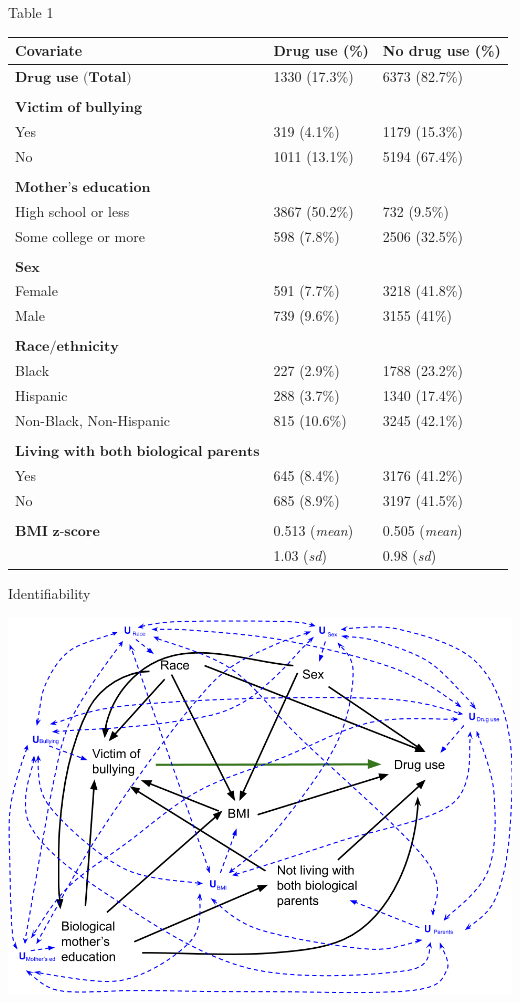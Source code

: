 \documentclass[ignorenonframetext,]{beamer}
\begin{document}
\begin{frame}{Table 1}

\fontsize{8}{8} \selectfont 

\begin{longtable}[]{@{}lll@{}}
\toprule
Covariate & Drug use (\%) & No drug use (\%)\tabularnewline
\midrule
\endhead
\(\textbf{Drug use (Total)}\) & 1330 (17.3\%) & 6373
(82.7\%)\tabularnewline
& &\tabularnewline
\(\textbf{Victim of bullying}\) & &\tabularnewline
Yes & 319 (4.1\%) & 1179 (15.3\%)\tabularnewline
No & 1011 (13.1\%) & 5194 (67.4\%)\tabularnewline
& &\tabularnewline
\(\textbf{Mother's education}\) & &\tabularnewline
High school or less & 3867 (50.2\%) & 732 (9.5\%)\tabularnewline
Some college or more & 598 (7.8\%) & 2506 (32.5\%)\tabularnewline
& &\tabularnewline
\(\textbf{Sex}\) & &\tabularnewline
Female & 591 (7.7\%) & 3218 (41.8\%)\tabularnewline
Male & 739 (9.6\%) & 3155 (41\%)\tabularnewline
& &\tabularnewline
\(\textbf{Race/ethnicity}\) & &\tabularnewline
Black & 227 (2.9\%) & 1788 (23.2\%)\tabularnewline
Hispanic & 288 (3.7\%) & 1340 (17.4\%)\tabularnewline
Non-Black, Non-Hispanic & 815 (10.6\%) & 3245 (42.1\%)\tabularnewline
& &\tabularnewline
\(\textbf{Living with both biological parents}\) & &\tabularnewline
Yes & 645 (8.4\%) & 3176 (41.2\%)\tabularnewline
No & 685 (8.9\%) & 3197 (41.5\%)\tabularnewline
& &\tabularnewline
\(\textbf{BMI z-score}\) & 0.513 (\emph{mean}) & 0.505
(\emph{mean})\tabularnewline
\textcolor{white}{x} & 1.03 (\emph{sd}) & 0.98
(\emph{sd})\tabularnewline
\bottomrule
\end{longtable}

\end{frame}

\begin{frame}{Identifiability}

\includegraphics[width=1\linewidth]{DAG Causal Final Project_reduced covariates with Us}

\end{frame}
\end{document}
